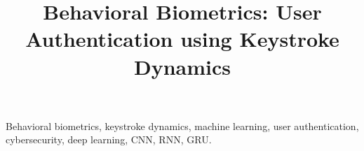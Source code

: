 \documentclass[conference]{IEEEtran}
\begin{document}
\nocite{*}

\title{Behavioral Biometrics: User Authentication using Keystroke Dynamics}

\author{
}

\maketitle

\begin{IEEEkeywords}
Behavioral biometrics, keystroke dynamics, machine learning, user authentication, cybersecurity, deep learning, CNN, RNN, GRU.
\end{IEEEkeywords}



\IEEEpeerreviewmaketitle












\end{document}
